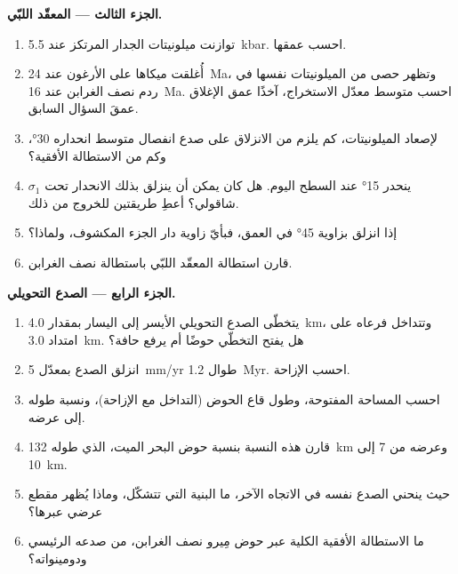 \begin{problem}
\medskip\noindent\textbf{الجزء الثالث --- المعقّد اللبّي.}
\begin{enumerate}[resume]
  \item توازنت ميلونيتات الجدار المرتكز عند \qty{5.5}{kbar}. احسب
        عمقها.
  \item أُغلقت ميكاها على الأرغون عند \qty{24}{Ma}،
        وتظهر حصى من الميلونيتات نفسها في ردم نصف الغرابن عند \qty{16}{Ma}.
        احسب متوسط معدّل الاستخراج، آخذًا عمق الإغلاق
        عمقَ السؤال السابق.
  \item لإصعاد الميلونيتات، كم يلزم من الانزلاق على صدع انفصال متوسط
        انحداره \ang{30}، وكم من الاستطالة الأفقية؟
  \item ينحدر  \ang{15} عند السطح اليوم. هل كان يمكن أن ينزلق بذلك
        الانحدار تحت $\sigma_1$ شاقولي؟ أعطِ طريقتين للخروج من ذلك.
  \item إذا انزلق بزاوية \ang{45} في العمق، فبأيّ زاوية دار الجزء المكشوف،
        ولماذا؟
  \item قارن استطالة المعقّد اللبّي
        باستطالة نصف الغرابن.
\end{enumerate}

\medskip\noindent\textbf{الجزء الرابع --- الصدع التحويلي.}
\begin{enumerate}[resume]
  \item يتخطّى الصدع التحويلي الأيسر إلى اليسار بمقدار \qty{4.0}{km}، وتتداخل
        فرعاه على امتداد \qty{3.0}{km}. هل يفتح التخطّي حوضًا
        أم يرفع حافة؟
  \item انزلق الصدع بمعدّل \qty{5}{mm/yr} طوال \qty{1.2}{Myr}. احسب
        الإزاحة.
  \item احسب المساحة المفتوحة، وطول قاع الحوض (التداخل مع الإزاحة)،
        ونسبة طوله إلى عرضه.
  \item قارن هذه النسبة بنسبة حوض البحر الميت، الذي طوله \qty{132}{km}
        وعرضه من 7 إلى \qty{10}{km}.
  \item حيث ينحني الصدع نفسه في الاتجاه الآخر، ما البنية التي تتشكّل،
        وماذا يُظهر مقطع عرضي عبرها؟
  \item ما الاستطالة الأفقية الكلية عبر حوض مِيرو نصف الغرابن، من صدعه
        الرئيسي ودومينواته؟
\end{enumerate}
\end{problem}
